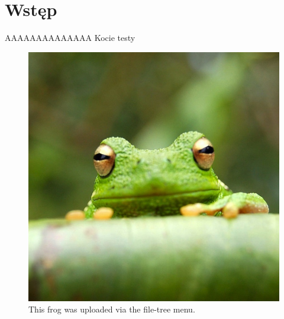 \chapter{Wstęp}



AAAAAAAAAAAAAA
Kocie testy


\begin{figure}
\centering
\includegraphics[width=0.25\linewidth]{chapters/01-wstep/figures/frog}
\caption{\label{fig:frog}This frog was uploaded via the file-tree menu.}
\end{figure}

